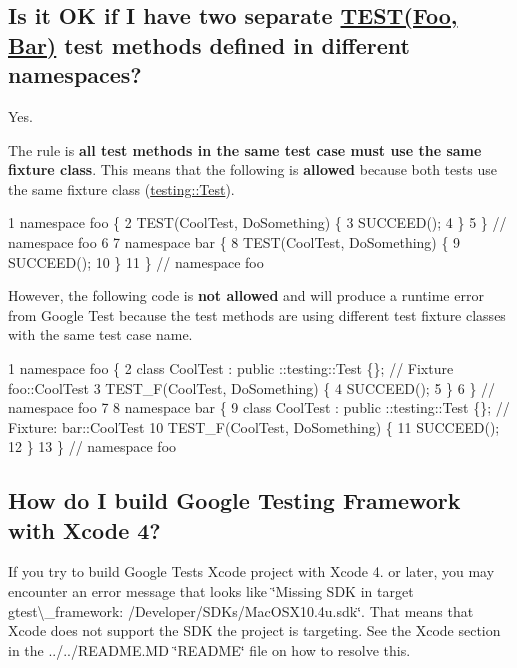 \subsection*{Is it OK if I have two separate {\ttfamily \hyperlink{gtest_8h_ad8b332753515c0ab8baada563c2547eb}{T\+E\+S\+T(\+Foo, Bar)}} test methods defined in different namespaces?}

Yes.

The rule is {\bfseries all test methods in the same test case must use the same fixture class}. This means that the following is {\bfseries allowed} because both tests use the same fixture class ({\ttfamily \hyperlink{classtesting_1_1Test}{testing\+::\+Test}}).


\begin{DoxyCode}
1 namespace foo \{
2 TEST(CoolTest, DoSomething) \{
3   SUCCEED();
4 \}
5 \}  // namespace foo
6 
7 namespace bar \{
8 TEST(CoolTest, DoSomething) \{
9   SUCCEED();
10 \}
11 \}  // namespace foo
\end{DoxyCode}


However, the following code is {\bfseries not allowed} and will produce a runtime error from Google Test because the test methods are using different test fixture classes with the same test case name.


\begin{DoxyCode}
1 namespace foo \{
2 class CoolTest : public ::testing::Test \{\};  // Fixture foo::CoolTest
3 TEST\_F(CoolTest, DoSomething) \{
4   SUCCEED();
5 \}
6 \}  // namespace foo
7 
8 namespace bar \{
9 class CoolTest : public ::testing::Test \{\};  // Fixture: bar::CoolTest
10 TEST\_F(CoolTest, DoSomething) \{
11   SUCCEED();
12 \}
13 \}  // namespace foo
\end{DoxyCode}


\subsection*{How do I build Google Testing Framework with Xcode 4?}

If you try to build Google Test\textquotesingle{}s Xcode project with Xcode 4. or later, you may encounter an error message that looks like \char`\"{}\+Missing S\+D\+K in target gtest\textbackslash{}\+\_\+framework\+: /\+Developer/\+S\+D\+Ks/\+Mac\+O\+S\+X10.\+4u.\+sdk\char`\"{}. That means that Xcode does not support the S\+DK the project is targeting. See the Xcode section in the ../../\+R\+E\+A\+D\+ME.MD \char`\"{}\+R\+E\+A\+D\+M\+E\char`\"{} file on how to resolve this.

